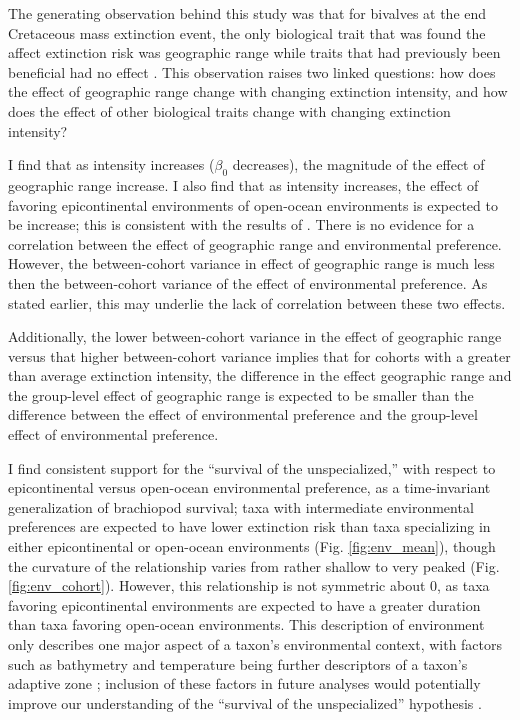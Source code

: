 \documentclass{article}
\begin{document}
The generating observation behind this study was that for bivalves at the end Cretaceous mass extinction event, the only biological trait that was found the affect extinction risk was geographic range while traits that had previously been beneficial had no effect \citep{Jablonski1986}. This observation raises two linked questions: how does the effect of geographic range change with changing extinction intensity, and how does the effect of other biological traits change with changing extinction intensity?

I find that as intensity increases (\(\beta_{0}\) decreases), the magnitude of the effect of geographic range increase. I also find that as intensity increases, the effect of favoring epicontinental environments of open-ocean environments is expected to be increase; this is consistent with the results of \citet{Miller2009a}. There is no evidence for a correlation between the effect of geographic range and environmental preference. However, the between-cohort variance in effect of geographic range is much less then the between-cohort variance of the effect of environmental preference. As stated earlier, this may underlie the lack of correlation between these two effects.

Additionally, the lower between-cohort variance in the effect of geographic range versus that higher between-cohort variance implies that for cohorts with a greater than average extinction intensity, the difference in the effect geographic range and the group-level effect of geographic range is expected to be smaller than the difference between the effect of environmental preference and the group-level effect of environmental preference.

I find consistent support for the ``survival of the unspecialized,'' with respect to epicontinental versus open-ocean environmental preference, as a time-invariant generalization of brachiopod survival; taxa with intermediate environmental preferences are expected to have lower extinction risk than taxa specializing in either epicontinental or open-ocean environments (Fig. \ref{fig:env_mean}), though the curvature of the relationship varies from rather shallow to very peaked (Fig. \ref{fig:env_cohort}). However, this relationship is not symmetric about 0, as taxa favoring epicontinental environments are expected to have a greater duration than taxa favoring open-ocean environments. This description of environment only describes one major aspect of a taxon's environmental context, with factors such as bathymetry and temperature being further descriptors of a taxon's adaptive zone \citep{Nurnberg2013a,Harnik2013,Harnik2011,Heim2011}; inclusion of these factors in future analyses would potentially improve our understanding of the ``survival of the unspecialized'' hypothesis \citep{Simpson1944}.
\end{document}
